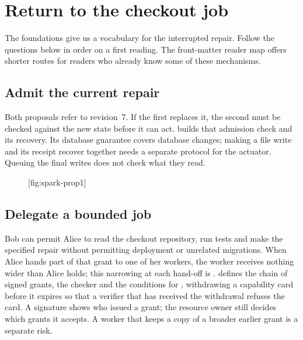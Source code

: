 

\section{Return to the checkout job}\label{sec:prereq-map}
The foundations give us a vocabulary for the interrupted repair. Follow the
questions below in order on a first reading. The front-matter reader map offers
shorter routes for readers who already know some of these mechanisms.

\subsection{Admit the current repair}
Both proposals refer to revision~7. If the first replaces it, the second must
be checked against the new state before it can act.  builds that
admission check and its recovery. Its database guarantee covers database
changes; making a file write and its receipt recover together needs a separate
protocol for the actuator. Queuing the final writes does not check what they
read.

\begin{figure}[tp]
  \centering
  [fig:spark-prop1]
\end{figure}

\subsection{Delegate a bounded job}
Bob can permit Alice to read the checkout repository, run tests and make the
specified repair without permitting deployment or unrelated migrations. When
Alice hands part of that grant to one of her workers, the worker receives
nothing wider than Alice holds; this narrowing at each hand-off is
.  defines the chain of signed grants, the checker
and the conditions for , withdrawing a capability card
before it expires so that a verifier that has received the withdrawal refuses
the card. A signature shows who issued a grant; the
resource owner still decides which grants it accepts. A worker that keeps a
copy of a broader earlier grant is a separate risk.

